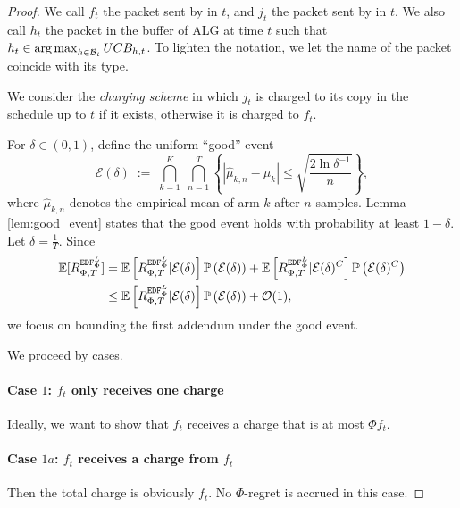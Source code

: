 \begin{proof}
    We call $f_t$ the packet sent by \alg in $t$, and $j_t$ the packet sent by \opt in $t$. We also call $h_t$ the packet in the buffer of ALG at time $t$ such that $h_t \in \operatorname*{arg\,max}_{h\in \mathcal{B}_t} UCB_{h,t}$. To lighten the notation, we let the name of the packet coincide with its type. 

    We consider the \textit{charging scheme} in which $j_t$ is charged to its copy in the \alg schedule up to $t$ if it exists, otherwise it is charged to $f_t$. 

    For $\delta \in (0,1)$, define the uniform ``good'' event
    \[
    \mathcal{E}\!\left(\delta\right)
    \;:=\;\bigcap_{k=1}^K\;\bigcap_{n=1}^{T}
    \left\{\left|\widehat{\mu}_{k,n}-\mu_k\right|\le \sqrt{\frac{2\ln \delta^{-1}}{n}}\right\},
    \]
    where $\widehat{\mu}_{k,n}$ denotes the empirical mean of arm $k$ after $n$ samples. Lemma \ref{lem:good_event} states that the good event holds with probability at least $1-\delta$. Let $\delta = \frac{1}{T}$. Since
    \begin{align*}
        \mathbb{E}[R_{\Phi,T}^{\text{\algedflearn}}] &= \mathbb{E}\left[R_{\Phi,T}^{\text{\algedflearn}}|\mathcal{E}(\delta)\right]\mathbb{P}\left(\mathcal{E}(\delta)\right) + \mathbb{E}\left[R_{\Phi,T}^{\text{\algedflearn}}|\mathcal{E}(\delta)^C\right]\mathbb{P}\left(\mathcal{E}(\delta)^C\right) \\
        &\le \mathbb{E}\left[R_{\Phi,T}^{\text{\algedflearn}}|\mathcal{E}(\delta)\right]\mathbb{P}\left(\mathcal{E}(\delta)\right) + \mathcal{O}(1),
    \end{align*}
    we focus on bounding the first addendum under the good event.
    
    We proceed by cases.

    \paragraph{Case $1$: $f_t$ only receives one charge}Ideally, we want to show that $f_t$ receives a charge that is at most $\Phi f_t$.
    \paragraph{Case $1a$: $f_t$ receives a charge from $f_t$} Then the total charge is obviously $f_t$. No $\Phi$-regret is accrued in this case.

\end{proof}
